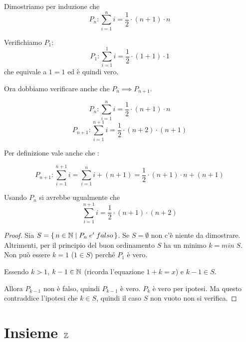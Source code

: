 \begin{example}
Dimostriamo per induzione che
\begin{equation*}
P_n : \sum\limits_{i=1}^n i = \frac{1}{2} \cdot (n+1) \cdot n
\end{equation*}

Verifichiamo $P_1$: 
\begin{equation*}
P_1 : \sum\limits_{i=1}^1 i = \frac{1}{2} \cdot (1+1) \cdot 1
\end{equation*}
che equivale a $1 = 1$ ed è quindi vero.

Ora dobbiamo verificare anche che $P_n \implies P_{n+1}$.

\begin{equation*}
P_n : \sum\limits_{i=1}^n i = \frac{1}{2} \cdot (n+1) \cdot n
\end{equation*}
\begin{equation*}
P_{n+1} : \sum\limits_{i=1}^{n+1} i = \frac{1}{2} \cdot (n+2) \cdot (n+1)
\end{equation*}

Per definizione vale anche che :

\begin{equation*}
P_{n+1} : \sum\limits_{i=1}^{n+1} i = \sum\limits_{i=1}^n i + (n + 1) =  \frac{1}{2} \cdot (n+1) \cdot n + (n+1)
\end{equation*}

Usando $P_n$ si avrebbe ugualmente che
\begin{equation*}
\sum\limits_{i=1}^{n+1} i = \frac{1}{2} \cdot (n+1) \cdot (n+2)
\end{equation*}

\end{example}

\begin{proof}
Sia $S = \set{n \in \mathbb N| P_n\;e'\;falso}$.
Se $S = \emptyset$ non c'è niente da dimostrare.
Altrimenti, per il principio del buon ordinamento $S$ ha un minimo $k = min\; S$. Non può essere $k = 1$ ($1 \in S$) perché $P_1$ è vero.

Essendo $k>1$, $k-1 \in \mathbb N$ (ricorda l'equazione $1+k=x$) e $k-1 \in S$.

Allora $P_{k-1}$ non è falso, quindi $P_{k-1}$ è vero. $P_k$ è vero per ipotesi. Ma questo contraddice l'ipotesi che $k \in S$, quindi il caso $S$ non vuoto non si verifica.
\end{proof}

\section{Insieme $\mathbb Z$}


